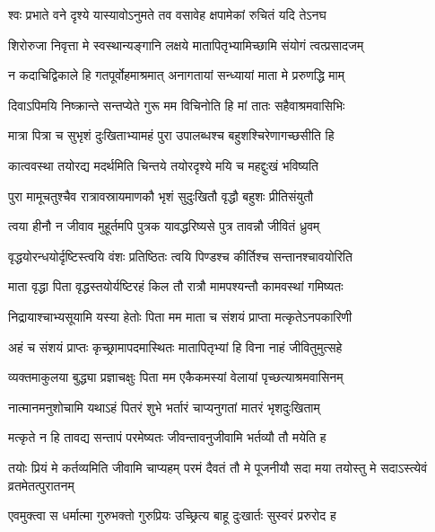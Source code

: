 \begin{center}
\twolineshloka
{श्वः प्रभाते वने दृश्ये यास्यावोऽनुमते तव}
{वसावेह क्षपामेकां रुचितं यदि तेऽनघ}




\twolineshloka
{शिरोरुजा निवृत्ता मे स्वस्थान्यङ्गानि लक्षये}
{मातापितृभ्यामिच्छामि संयोगं त्वत्प्रसादजम्}


\twolineshloka
{न कदाचिद्विकाले हि गतपूर्वोहमाश्रमात्}
{अनागतायां सन्ध्यायां माता मे प्ररुणद्धि माम्}


\twolineshloka
{दिवाऽपिमयि निष्क्रान्ते सन्तप्येते गुरू मम}
{विचिनोति हि मां तातः सहैवाश्रमवासिभिः}


\twolineshloka
{मात्रा पित्रा च सुभृशं दुःखिताभ्यामहं पुरा}
{उपालब्धश्च बहुशश्चिरेणागच्छसीति हि}


\twolineshloka
{कात्ववस्था तयोरद्य मदर्थमिति चिन्तये}
{तयोरदृश्ये मयि च महद्दुःखं भविष्यति}


\twolineshloka
{पुरा मामूचतुश्चैव रात्रावस्रायमाणकौ}
{भृशं सुदुःखितौ वृद्धौ बहुशः प्रीतिसंयुतौ}


\twolineshloka
{त्वया हीनौ न जीवाव मुहूर्तमपि पुत्रक}
{यावद्धरिष्यसे पुत्र तावन्नौ जीवितं ध्रुवम्}


\twolineshloka
{वृद्धयोरन्धयोर्दृष्टिस्त्वयि वंशः प्रतिष्ठितः}
{त्वयि पिण्डश्च कीर्तिश्च सन्तानश्चावयोरिति}


\twolineshloka
{माता वृद्धा पिता वृद्धस्तयोर्यष्टिरहं किल}
{तौ रात्रौ मामपश्यन्तौ कामवस्थां गमिष्यतः}


\twolineshloka
{निद्रायाश्चाभ्यसूयामि यस्या हेतोः पिता मम}
{माता च संशयं प्राप्ता मत्कृतेऽनपकारिणी}


\twolineshloka
{अहं च संशयं प्राप्तः कृच्छ्रामापदमास्थितः}
{मातापितृभ्यां हि विना नाहं जीवितुमुत्सहे}


\twolineshloka
{व्यक्तमाकुलया बुद्ध्या प्रज्ञाचक्षुः पिता मम}
{एकैकमस्यां वेलायां पृच्छत्याश्रमवासिनम्}


\twolineshloka
{नात्मानमनुशोचामि यथाऽहं पितरं शुभे}
{भर्तारं चाप्यनुगतां मातरं भृशदुःखिताम्}


\twolineshloka
{मत्कृते न हि तावद्य सन्तापं परमेष्यतः}
{जीवन्तावनुजीवामि भर्तव्यौ तौ मयेति ह}


\threelineshloka
{तयोः प्रियं मे कर्तव्यमिति जीवामि चाप्यहम्}
{परमं दैवतं तौ मे पूजनीयौ सदा मया}
{तयोस्तु मे सदाऽस्त्येवं  व्रतमेतत्पुरातनम्}




\twolineshloka
{एवमुक्त्वा स धर्मात्मा गुरुभक्तो गुरुप्रियः}
{उच्छ्रित्य बाहू दुःखार्तः सुस्वरं प्ररुरोद ह}



\end{center}
